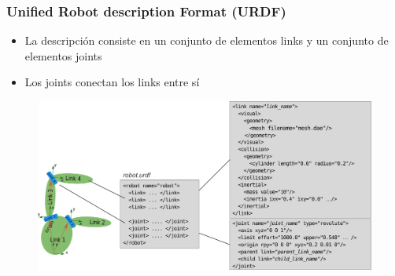 \begin{frame}
	\frametitle{Unified Robot description Format (URDF)}
	
	\begin{itemize}
		\item La descripción consiste en un conjunto de elementos links y un conjunto de elementos joints
		\item Los joints conectan los links entre sí
	\end{itemize}
	
	\begin{figure}[!h]
		\centering
		\includegraphics[width=0.8\columnwidth]{images/urdf_driagram.pdf}
	\end{figure}
\end{frame}

